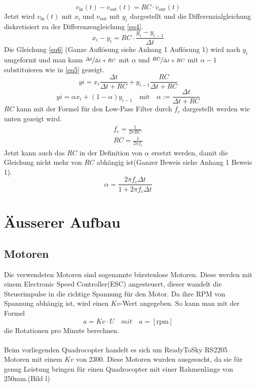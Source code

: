 \documentclass[12pt,a4paper, ngerman]{article}
\begin{document}
\begin{equation} \label{eq111}
v_{\text{in}}(t)-v_{\text{out}}(t)=RC\cdot \dot{v}_{\text{out}}(t)
\end{equation}
Jetzt wird $v_{\text{in}}(t)$ mit $x_{i}$ und $v_{\text{out}}$ mit $y_{i}$ dargestellt und die Differenzialgleichung diskretisiert zu der Differenzengleichung \ref{eq4}.
\begin{equation}\label{eq4}
x_{i}-y_{i}=RC\cdot \frac{y_{i}-y_{i-1}}{\Delta t}
\end{equation}
Die Gleichung \ref{eq6} (Ganze Auflösung siehe Anhang 1 Auflösung 1) wird nach $y_{i}$ umgeformt und man kann $\sfrac{\Delta t}{\Delta t+RC}$  mit $\alpha$ und $\sfrac{RC}{\Delta t + RC}$ mit $\alpha-1$ substituieren wie in \ref{eq5} gezeigt.
\begin{equation} \label{eq6}
y{i}=x_{i}\frac{\Delta t}{\Delta t+RC} + y_{i-1}\frac{RC}{\Delta t+RC}
\end{equation} 
\begin{equation}\label{eq5}
y{i}=\alpha x_{i} + (1-\alpha)y_{i-1} \quad \text{mit} \quad \alpha:=\frac{\Delta t}{\Delta t+RC}
\end{equation}
$RC$ kann mit der Formel für den Low-Pass Filter durch $f_{c}$ dargestellt werden wie unten gezeigt wird.
\begin{align*}
f_{c} = \frac{1}{2\pi RC} \\
RC = \frac{1}{2\pi f_{c}} 
\end{align*}
Jetzt kann auch das $RC$ in der Definition von $\alpha$ ersetzt werden, damit die Gleichung nicht mehr von $RC$ abhängig ist(Ganzer Beweis siehe Anhang 1 Beweis 1).
\begin{equation*}
\alpha = \frac{2\pi f_{c}\Delta t}{1+2\pi f_{c}\Delta t} 
\end{equation*}
\newpage
\section{Äusserer Aufbau}
\subsection{Motoren}
Die verwendeten Motoren sind sogenannte bürstenlose Motoren. Diese werden mit einem Electronic Speed Controller(ESC) angesteuert, dieser wandelt die Steuerimpulse in die richtige Spannung für den Motor. Da ihre RPM von Spannung abhängig ist, wird einen $Kv$-Wert angegeben. So kann man mit der Formel
\begin{equation}
a=Kv\cdot U \quad mit \quad a=[\text{rpm}]
\end{equation}
die Rotationen pro Minute berechnen.\\ \\
Beim vorliegenden Quadrocopter handelt es sich um ReadyToSky RS2205 Motoren mit einem $Kv$ von 2300. Diese Motoren wurden ausgesucht, da sie für genug Leistung bringen für einen Quadrocopter mit einer Rahmenlänge von 250mm.(Bild l)
\end{document}
